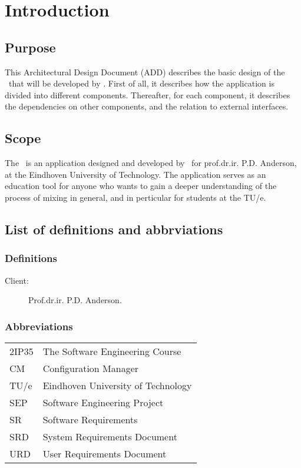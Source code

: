 \chapter{Introduction}

\section{Purpose}
This Architectural Design Document (ADD) describes the basic design of the \applicationname\ that will be developed by \projectauthor. First of all, it describes how the application is divided into different components. Thereafter, for each component, it describes the dependencies on other components, and the relation to external interfaces.

\section{Scope}
The \applicationname\ is an application designed and developed by \projectauthor\ for prof.dr.ir. P.D. Anderson, at the Eindhoven University of Technology. The application serves as an education tool for anyone who wants to gain a deeper understanding of the process of mixing in general, and in perticular for students at the TU/e.

\section{List of definitions and abbrviations}
\subsection{Definitions}
\begin{description}
\item[Client:] Prof.dr.ir. P.D. Anderson.
\end{description}

\subsection{Abbreviations}
\begin{tabular}{l|l}
2IP35 & The Software Engineering Course \\
CM    &Configuration Manager \\
TU/e  &Eindhoven University of Technology \\
SEP   &Software Engineering Project \\
SR    &Software Requirements \\
SRD & System Requirements Document \\
URD   &User Requirements Document \\
\end{tabular}
\\

